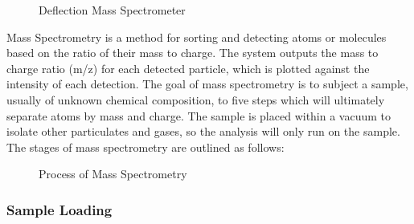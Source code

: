 \documentclass[letterpaper, 10 pt, conference]{ieeeconf}  %
\begin{document}
        \begin{figure}[h]
            \centering
        
            \caption{Deflection Mass Spectrometer\autocite{R7,R9}}
        \end{figure}

        Mass Spectrometry is a method for sorting and detecting atoms or molecules based on the ratio of their mass to charge. The system outputs the mass to charge ratio (m/z) for each detected particle, which is plotted against the intensity of each detection. The goal of mass spectrometry is to subject a sample, usually of unknown chemical composition, to five steps which will ultimately separate atoms by mass and charge. The sample is placed within a vacuum to isolate other particulates and gases, so the analysis will only run on the sample. The stages of mass spectrometry are outlined as follows:

        \begin{figure}[h]
            \centering
        
            \caption{Process of Mass Spectrometry}
        \end{figure}

        \subsubsection{\textbf{Sample Loading}}\hfill\hfill
        \vspace{5 pt}
\end{document}
